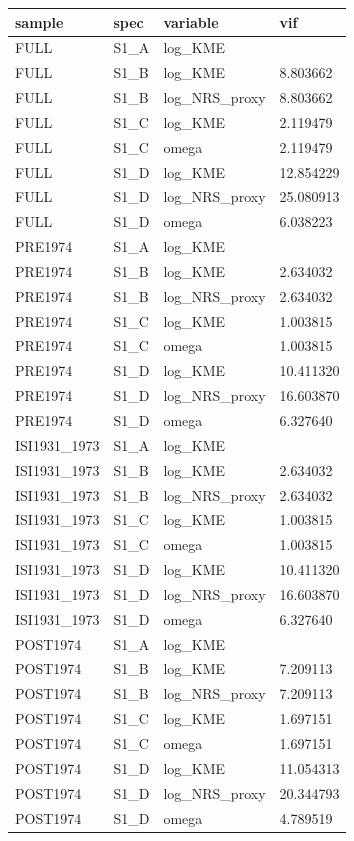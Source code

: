 \begin{tabular}{llll}
\hline
sample & spec & variable & vif \\
\hline
FULL & S1\_A & log\_KME &  \\
FULL & S1\_B & log\_KME & 8.803662 \\
FULL & S1\_B & log\_NRS\_proxy & 8.803662 \\
FULL & S1\_C & log\_KME & 2.119479 \\
FULL & S1\_C & omega & 2.119479 \\
FULL & S1\_D & log\_KME & 12.854229 \\
FULL & S1\_D & log\_NRS\_proxy & 25.080913 \\
FULL & S1\_D & omega & 6.038223 \\
PRE1974 & S1\_A & log\_KME &  \\
PRE1974 & S1\_B & log\_KME & 2.634032 \\
PRE1974 & S1\_B & log\_NRS\_proxy & 2.634032 \\
PRE1974 & S1\_C & log\_KME & 1.003815 \\
PRE1974 & S1\_C & omega & 1.003815 \\
PRE1974 & S1\_D & log\_KME & 10.411320 \\
PRE1974 & S1\_D & log\_NRS\_proxy & 16.603870 \\
PRE1974 & S1\_D & omega & 6.327640 \\
ISI1931\_1973 & S1\_A & log\_KME &  \\
ISI1931\_1973 & S1\_B & log\_KME & 2.634032 \\
ISI1931\_1973 & S1\_B & log\_NRS\_proxy & 2.634032 \\
ISI1931\_1973 & S1\_C & log\_KME & 1.003815 \\
ISI1931\_1973 & S1\_C & omega & 1.003815 \\
ISI1931\_1973 & S1\_D & log\_KME & 10.411320 \\
ISI1931\_1973 & S1\_D & log\_NRS\_proxy & 16.603870 \\
ISI1931\_1973 & S1\_D & omega & 6.327640 \\
POST1974 & S1\_A & log\_KME &  \\
POST1974 & S1\_B & log\_KME & 7.209113 \\
POST1974 & S1\_B & log\_NRS\_proxy & 7.209113 \\
POST1974 & S1\_C & log\_KME & 1.697151 \\
POST1974 & S1\_C & omega & 1.697151 \\
POST1974 & S1\_D & log\_KME & 11.054313 \\
POST1974 & S1\_D & log\_NRS\_proxy & 20.344793 \\
POST1974 & S1\_D & omega & 4.789519 \\
\hline
\end{tabular}
